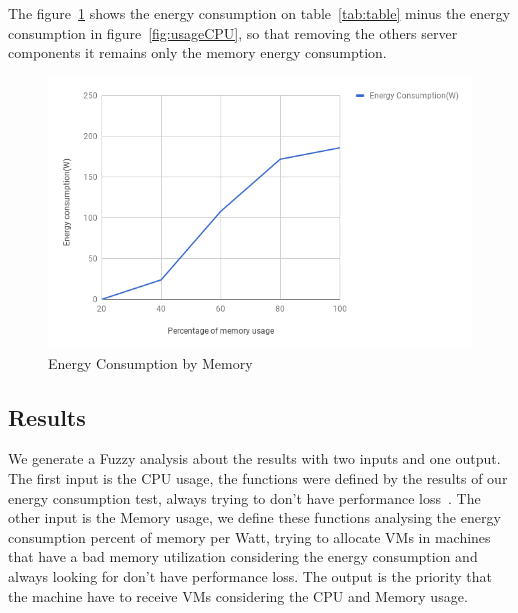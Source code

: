 \documentclass[runningheads,a4paper]{llncs}
\begin{document}
The figure~\ref{fig:memgraphic} shows the energy consumption on table~\ref{tab:table} minus the energy consumption in figure~\ref{fig:usageCPU}, so that removing the others server components it remains only the memory energy consumption.
\begin{figure}[H]
    \centering
    \includegraphics[scale=.6]{imagens/DRAM.png}
    \caption{Energy Consumption by Memory}
    \label{fig:memgraphic}
\end{figure}






\subsection{Results}%
 
We generate a Fuzzy analysis about the results with two inputs and one output. The first input is the CPU usage, the functions were defined by the results of our energy consumption test, always trying to don't have performance loss~\cite{Haydar}. The other input is the Memory usage, we define these functions analysing the energy consumption percent of memory per Watt, trying to allocate VMs in machines that have a bad memory utilization considering the energy consumption and always looking for don't have performance loss. The output is the priority that the machine have to receive VMs considering the CPU and Memory usage.
\end{document}

